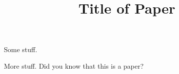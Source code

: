 \documentclass[12pt,letterpaper]{article}
\title{Title of Paper}
\begin{document}
Some stuff. \cite[70]{morrison02aa}

More stuff. \cite{slinger07aa}
Did you know that this is a paper? \cite{public99ac}
\end{document}
